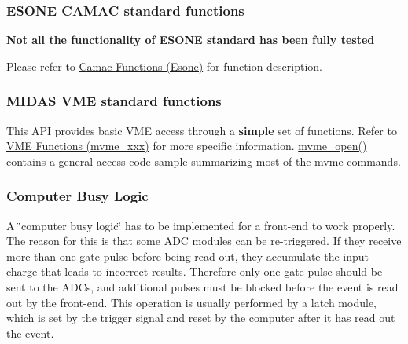 \label{FE_camac_vme_function_calls_idx_hardware_CAMAC_functions_ESONE}
\hypertarget{FE_camac_vme_function_calls_idx_hardware_CAMAC_functions_ESONE}{}
 

 \hypertarget{FE_camac_vme_function_calls_FE_ESONE_CAMAC_standard_functions}{}\subsubsection{ESONE CAMAC standard functions}\label{FE_camac_vme_function_calls_FE_ESONE_CAMAC_standard_functions}
{\bfseries Not all the functionality of ESONE standard has been fully tested}

Please refer to \hyperlink{group__mesonefunctionc}{Camac Functions (Esone)} for function description.

\label{FE_camac_vme_function_calls_idx_hardware_standard_interface_VME}
\hypertarget{FE_camac_vme_function_calls_idx_hardware_standard_interface_VME}{}
 

 \hypertarget{FE_camac_vme_function_calls_FE_Midas_VME_standard_functions}{}\subsubsection{MIDAS VME standard functions}\label{FE_camac_vme_function_calls_FE_Midas_VME_standard_functions}
This API provides basic VME access through a {\bfseries simple} set of functions. Refer to \hyperlink{group__mvmestdfunctionh}{VME Functions (mvme\_\-xxx)} for more specific information. \hyperlink{group__mvmestdfunctionh_ga13db7fc7c7c022e46fadd8fc4dc40047}{mvme\_\-open()} contains a general access code sample summarizing most of the mvme commands.

\label{FE_camac_vme_function_calls_idx_hardware_computer-busy}
\hypertarget{FE_camac_vme_function_calls_idx_hardware_computer-busy}{}
 

 \hypertarget{FE_camac_vme_function_calls_FE_Compute_Busy_Logic}{}\subsubsection{Computer Busy Logic}\label{FE_camac_vme_function_calls_FE_Compute_Busy_Logic}
A \char`\"{}computer busy logic\char`\"{} has to be implemented for a front-\/end to work properly. The reason for this is that some ADC modules can be re-\/triggered. If they receive more than one gate pulse before being read out, they accumulate the input charge that leads to incorrect results. Therefore only one gate pulse should be sent to the ADCs, and additional pulses must be blocked before the event is read out by the front-\/end. This operation is usually performed by a latch module, which is set by the trigger signal and reset by the computer after it has read out the event.

